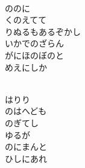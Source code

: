 \documentclass[10pt,b5j]{tarticle} %
\begin{document}
\begin{enumerate}
\begin{minipage}[c]{\blocksize}
    \end{minipage}
    \begin{minipage}[c]{\blocksize}
        
        \vspace{\linespace}
        \item~\\
        ののに\\
        くのえてて\\
        りぬるもあるぞかし\\
        いかでのざらん\\
        がにほのぼのと\\
        めえにしか
        
    \end{minipage}
    \begin{minipage}[c]{\blocksize}
        
        \vspace{\linespace}
        \item~\\
        はりり\\
        のはへども\\
        のぎてし\\
        ゆるが\\
        のにまんと\\
        ひしにあれ
    
    \end{minipage}
\end{enumerate} %
\end{document}
